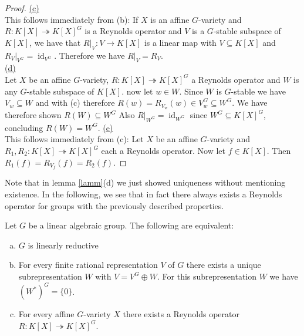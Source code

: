 \begin{proof}
  \underline{(c)}\\
  This follows immediately from (b):
  If $X$ is an affine $G$-variety and $R \colon K[X] \twoheadrightarrow K[X]^G$ is a Reynolds operator and $V$ is a $G$-stable subspace of $K[X]$, we have that $\left. R \right|_V \colon V \longrightarrow K[X]$ is a linear map with $V \subseteq K[X]$ and $\left. R_V \right|_{V^G} = \operatorname{id}_{V^G}$.
  Therefore we have $\left. R \right|_V = R_V$.  \\
  \underline{(d)}\\
  Let $X$ be an affine $G$-variety, $R \colon K[X] \twoheadrightarrow K[X]^G$ a Reynolds operator and $W$ is any $G$-stable subspace of $K[X]$.
  now let $w \in W$.
  Since $W$ is $G$-stable we have $V_w \subseteq W$ and with (c) therefore $R(w) = R_{V_w} (w) \in V_w^G \subseteq W^G$.
  We have therefore shown $R(W) \subseteq W^G$
  Also $\left. R \right|_{W^G} = \operatorname{id}_{W^G}$ since $W^G \subseteq K[X]^G$, concluding $R(W) = W^G$.
  \underline{(e)}\\
  This follows immediately from (c):
  Let $X$ be an affine $G$-variety and $R_1,R_2 \colon K[X] \twoheadrightarrow K[X]^G$ each a Reynolds operator.
  Now let $f \in K[X]$.
  Then $R_1(f) = R_{V_f} (f) = R_2 (f)$.
\end{proof}

\begin{remark}
  Note that in lemma \ref{lamm}(d) we just showed uniqueness without mentioning existence.
  In the following, we see that in fact there always exists a Reynolds operator for groups with the previously described properties.
\end{remark}


\begin{theorem}\label{equiv}
  Let $G$ be a linear algebraic group.
  The following are equivalent:
  \begin{enumerate}[(a)]
  \item $G$ is linearly reductive
  \item For every finite rational representation $V$ of $G$ there exists a unique subrepresentation $W$ with $V = V^G \oplus W$.
    For this subrepresentation $W$ we have $(W^\ast)^G = \{0\}$.
  \item For every affine $G$-variety $X$ there exists a Reynolds operator $R \colon K[X] \twoheadrightarrow K[X]^G $.
  \end{enumerate}
\end{theorem}

